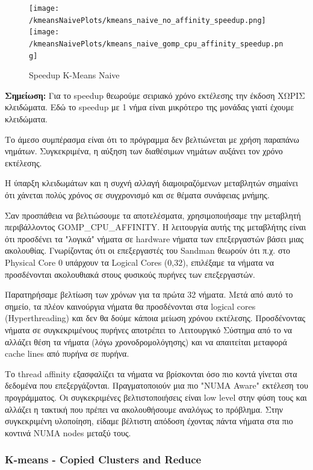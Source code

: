 \documentclass[letterpaper,12pt]{article}
\begin{document}
\begin{figure}[H]
    \centering
    \texttt{[image: /kmeansNaivePlots/kmeans\_naive\_no\_affinity\_speedup.png]}
    \texttt{[image: /kmeansNaivePlots/kmeans\_naive\_gomp\_cpu\_affinity\_speedup.png]}
    \caption{Speedup K-Means Naive}
    \label{fig:Speedup K-Means Naive}
\end{figure}

\textbf{Σημείωση:} Για το speedup θεωρούμε σειριακό χρόνο εκτέλεσης την έκδοση ΧΩΡΙΣ κλειδώματα.
Εδώ το speedup με 1 νήμα είναι μικρότερο της μονάδας γιατί έχουμε κλειδώματα.
\vspace{4pt}

Το άμεσο συμπέρασμα είναι ότι το πρόγραμμα δεν βελτιώνεται με χρήση παραπάνω νημάτων. Συγκεκριμένα, 
η αύξηση των διαθέσιμων νημάτων αυξάνει τον χρόνο εκτέλεσης. 

Η ύπαρξη κλειδωμάτων και η συχνή αλλαγή διαμοιραζόμενων μεταβλητών σημαίνει ότι χάνεται πολύς χρόνος σε
συγχρονισμό και σε θέματα συνάφειας μνήμης. 

Σαν προσπάθεια να βελτιώσουμε τα αποτελέσματα, χρησιμοποιήσαμε την μεταβλητή περιβάλλοντος GOMP\_CPU\_AFFINITY.
Η λειτουργία αυτής της μεταβλήτης είναι ότι προσδένει τα "λογικά" νήματα σε hardware νήματα των επεξεργαστών βάσει μιας ακολουθίας.
Γνωρίζοντας ότι οι επεξεργαστές του Sandman θεωρούν ότι π.χ. στο Physical Core 0 υπάρχουν τα Logical Cores (0,32),
επιλέξαμε τα νήματα να προσδένονται ακολουθιακά στους φυσικούς πυρήνες των επεξεργαστών.

Παρατηρήσαμε βελτίωση των χρόνων για τα πρώτα 32 νήματα. Μετά από αυτό το σημείο, τα πλέον καινούργια νήματα
θα προσδένονται στα logical cores (Hyperthreading) και δεν θα δούμε κάποια μείωση χρόνου εκτέλεσης.
Προσδένοντας νήματα σε συγκεκριμένους πυρήνες αποτρέπει το Λειτουργικό Σύστημα από το να αλλάζει θέση τα νήματα (λόγω χρονοδρομολόγησης)
και να απαιτείται μεταφορά cache lines από πυρήνα σε πυρήνα.

Το thread affinity εξασφαλίζει τα νήματα να βρίσκονται όσο πιο κοντά γίνεται στα δεδομένα που επεξεργάζονται. Πραγματοποιούν
μια πιο "NUMA Aware" εκτέλεση του προγράμματος. Οι συγκεκριμένες βελτιστοποιήσεις είναι low level στην φύση τους και αλλάζει η 
τακτική που πρέπει να ακολουθήσουμε αναλόγως το πρόβλημα. Στην συγκεκριμένη υλοποίηση, είδαμε βέλτιστη απόδοση έχοντας πάντα νήματα
στα πιο κοντινά NUMA nodes μεταξύ τους. 

\subsubsection{K-means - Copied Clusters and Reduce}
\end{document}
